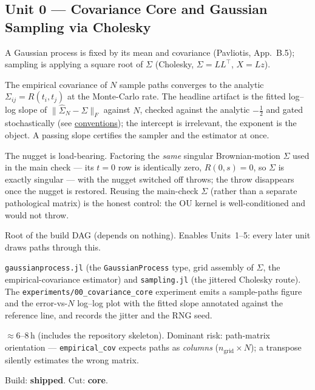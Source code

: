 \documentclass[11pt]{article}
\newcommand{\pav}[1]{{\small\color{hubblue}(Pavliotis, #1)}}
\newenvironment{brief}{%
  \begin{description}[style=sameline,leftmargin=2.3cm,font=\bfseries\color{hubblue}]
}{%
  \end{description}
}
\begin{document}
\subsection*{Unit 0 --- Covariance Core and Gaussian Sampling via Cholesky}
\begin{brief}
\item[Idea] A Gaussian process is fixed by its mean and covariance \pav{App.~B.5}; sampling is
applying a square root of $\Sigma$ (Cholesky, $\Sigma=LL^\top$, $X=Lz$).
\item[Proves] The empirical covariance of $N$ sample paths converges to the analytic
$\Sigma_{ij}=R(t_i,t_j)$ at the Monte-Carlo rate. The headline artifact is the fitted log--log slope
of $\|\widehat\Sigma_N-\Sigma\|_F$ against $N$, checked against the analytic $-\tfrac12$ and gated
stochastically (see \hyperref[sec:conv]{conventions}); the intercept is irrelevant, the exponent is
the object. A passing slope certifies the sampler and the estimator at once.
\item[Falsifier] The nugget is load-bearing. Factoring the \emph{same} singular Brownian-motion
$\Sigma$ used in the main check --- its $t=0$ row is identically zero, $R(0,s)=0$, so $\Sigma$ is
exactly singular --- with the nugget switched off throws; the throw disappears once the nugget is
restored. Reusing the main-check $\Sigma$ (rather than a separate pathological matrix) is the honest
control: the OU kernel is well-conditioned and would not throw.
\item[Depends on / enables] Root of the build DAG (depends on nothing). Enables Units~1--5: every
later unit draws paths through this.
\item[Deliverable shape] \texttt{gaussianprocess.jl} (the \texttt{GaussianProcess} type, grid
assembly of $\Sigma$, the empirical-covariance estimator) and \texttt{sampling.jl} (the jittered
Cholesky route). The \texttt{experiments/00\_covariance\_core} experiment emits a sample-paths figure
and the error-vs-$N$ log--log plot with the fitted slope annotated against the reference line, and
records the jitter and the RNG seed.
\item[Effort \& risk] $\approx 6$--$8$\,h (includes the repository skeleton). Dominant risk:
path-matrix orientation --- \texttt{empirical\_cov} expects paths as \emph{columns}
($n_{\text{grid}}\times N$); a transpose silently estimates the wrong matrix.
\item[Status] Build: \textbf{shipped}. Cut: \textbf{core}.
\end{brief}
\end{document}
